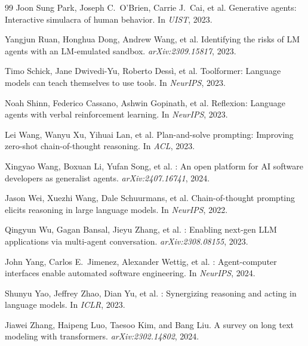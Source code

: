 \documentclass{article}
\begin{document}
\begin{thebibliography}{99}
Joon Sung Park, Joseph C.\ O'Brien, Carrie J.\ Cai, et al.
\newblock Generative agents: Interactive simulacra of human behavior.
\newblock In \textit{UIST}, 2023.

Yangjun Ruan, Honghua Dong, Andrew Wang, et al.
\newblock Identifying the risks of {LM} agents with an {LM}-emulated sandbox.
\newblock \textit{arXiv:2309.15817}, 2023.

Timo Schick, Jane Dwivedi-Yu, Roberto Dess{\`i}, et al.
\newblock Toolformer: Language models can teach themselves to use tools.
\newblock In \textit{NeurIPS}, 2023.

Noah Shinn, Federico Cassano, Ashwin Gopinath, et al.
\newblock Reflexion: Language agents with verbal reinforcement learning.
\newblock In \textit{NeurIPS}, 2023.

Lei Wang, Wanyu Xu, Yihuai Lan, et al.
\newblock Plan-and-solve prompting: Improving zero-shot chain-of-thought reasoning.
\newblock In \textit{ACL}, 2023.

Xingyao Wang, Boxuan Li, Yufan Song, et al.
: An open platform for {AI} software developers as generalist agents.
\newblock \textit{arXiv:2407.16741}, 2024.

Jason Wei, Xuezhi Wang, Dale Schuurmans, et al.
\newblock Chain-of-thought prompting elicits reasoning in large language models.
\newblock In \textit{NeurIPS}, 2022.

Qingyun Wu, Gagan Bansal, Jieyu Zhang, et al.
: Enabling next-gen {LLM} applications via multi-agent conversation.
\newblock \textit{arXiv:2308.08155}, 2023.

John Yang, Carlos E.\ Jimenez, Alexander Wettig, et al.
: Agent-computer interfaces enable automated software engineering.
\newblock In \textit{NeurIPS}, 2024.

Shunyu Yao, Jeffrey Zhao, Dian Yu, et al.
: Synergizing reasoning and acting in language models.
\newblock In \textit{ICLR}, 2023.

Jiawei Zhang, Haipeng Luo, Taesoo Kim, and Bang Liu.
\newblock A survey on long text modeling with transformers.
\newblock \textit{arXiv:2302.14802}, 2024.

\end{thebibliography}
\end{document}
